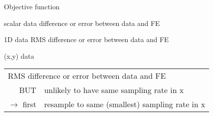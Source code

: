 \begin{frame}{Objective function}
\hfill

\begin{block}{scalar data}
difference or error between data and FE
\end{block}

\begin{block}{1D data}
RMS difference or error between data and FE
\end{block}

{\setlength{\tabcolsep}{.1em}
\begin{block}{(x,y) data}
\begin{tabular}{rl}
\multicolumn{2}{l}{RMS difference or error between data and FE}\\[0.5ex] 
  BUT& unlikely to have same sampling rate in x\\
  $\longrightarrow$ first& resample to same (smallest) sampling rate in x\\
\end{tabular}
\end{block}}
\end{frame}
